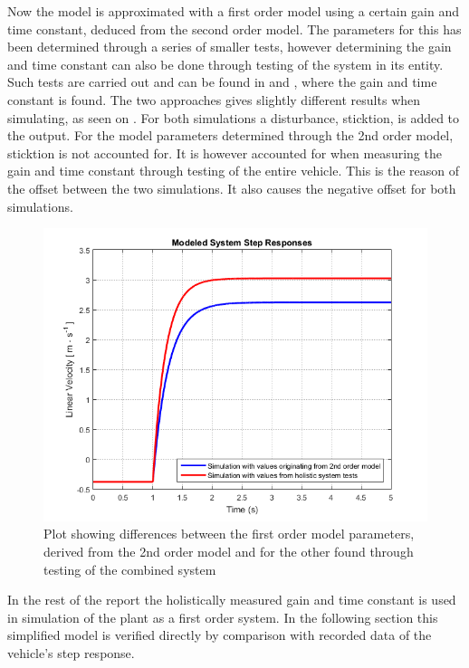 Now the model is approximated with a first order model using a certain gain and time constant, deduced from the second order model. The parameters for this has been determined through a series of smaller tests, however determining the gain and time constant can also be done through testing of the system in its entity. Such tests are carried out and can be found in  and , where the gain and time constant is found.
The two approaches gives slightly different results when simulating, as seen on . For both simulations a disturbance, sticktion, is added to the output. For the model parameters determined through the 2nd order model, sticktion is not accounted for. It is however accounted for when measuring the gain and time constant through testing of the entire vehicle. This is the reason of the offset between the two simulations. It also causes the negative offset for both simulations.
%
\begin{figure}[H]
	\centering
	\includegraphics[width = \textwidth]{figures/ComparingFirstOrderModels.png}
	\caption{Plot showing differences between the first order model parameters, derived from the 2nd order model and for the other found through testing of the combined system}
	\label{fig:ComparingFirstOrderModels}
\end{figure}
%
In the rest of the report the holistically measured gain and time constant is used in simulation of the plant as a first order system. In the following section this simplified model is verified directly by comparison with recorded data of the vehicle's step response.